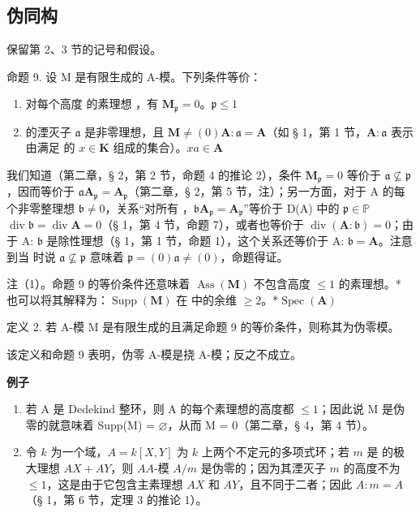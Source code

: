 \subsection{伪同构}

保留第 2、3 节的记号和假设。

命题 9. 设 M 是有限生成的 A-模。下列条件等价：

\begin{enumerate}
\def\labelenumi{(\alph{enumi})}
\item
  对每个高度  的素理想 ，有 \(\mathbf{M}_{\mathfrak{p}} = 0\)。\(\mathfrak{p}\)\(\leqslant 1\)
\item
   的湮灭子 \(\mathfrak{a}\) 是非零理想，且 \(\mathbf{M}\)\(\neq (0)\)\(\mathbf{A}:\mathfrak{a} = \mathbf{A}\)（如 § 1，第 1 节，\(\mathbf{A}:\mathfrak{a}\) 表示由满足  的 \(x\in \mathbf{K}\) 组成的集合）。\(xa\in \mathbf{A}\)
\end{enumerate}

我们知道（第二章，§ 2，第 2 节，命题 4 的推论 2），条件 \(\mathbf{M}_{\mathfrak{p}} = 0\) 等价于 \(\mathfrak{a} \nsubseteq \mathfrak{p}\)，因而等价于 \(\mathfrak{a}\mathbf{A}_{\mathfrak{p}} = \mathbf{A}_{\mathfrak{p}}\)（第二章，§ 2，第 5 节，注）；另一方面，对于 A 的每个非零整理想 \(\mathfrak{b} \neq 0\)，关系``对所有 ，\(\mathfrak{b}\mathbf{A}_{\mathfrak{p}} = \mathbf{A}_{\mathfrak{p}}\)''等价于 D(A) 中的 \(\mathfrak{p} \in \mathbb{P}\)\(\operatorname{div} \mathfrak{b} = \operatorname{div} \mathbf{A} = 0\)（§ 1，第 4 节，命题 7），或者也等价于 \(\operatorname{div}(\mathbf{A}: \mathfrak{b}) = 0\)；由于 A: \(\mathfrak{b}\) 是除性理想（§ 1，第 1 节，命题 1），这个关系还等价于 A: \(\mathfrak{b} = \mathbf{A}\)。注意到当  时说 \(\mathfrak{a} \nsubseteq \mathfrak{p}\) 意味着 \(\mathfrak{p} = (0)\)\(\mathfrak{a} \neq (0)\)，命题得证。

注（1）。命题 9 的等价条件还意味着 \(\operatorname{Ass}(\mathbf{M})\) 不包含高度 \(\leqslant 1\) 的素理想。* 也可以将其解释为：\(\operatorname{Supp}(\mathbf{M})\) 在  中的余维 \(\geqslant 2\)。*\(\operatorname{Spec}(\mathbf{A})\)

定义 2. 若 A-模 M 是有限生成的且满足命题 9 的等价条件，则称其为伪零模。

该定义和命题 9 表明，伪零 A-模是挠 A-模；反之不成立。

\textbf{例子}\par

\begin{enumerate}
\def\labelenumi{(\arabic{enumi})}
\item
  若 A 是 Dedekind 整环，则 A 的每个素理想的高度都 \(\leqslant1\)；因此说 M 是伪零的就意味着 Supp(M) = \(\varnothing\)，从而 M = 0（第二章，§ 4，第 4 节）。
\item
  令 \(k\) 为一个域，\(A = k[X, Y]\) 为 \(k\) 上两个不定元的多项式环；若 \(m\) 是  的极大理想 \(AX + AY\)，则 \(A\)\(A\)-模 \(A/m\) 是伪零的；因为其湮灭子 \(m\) 的高度不为 \(\leqslant 1\)，这是由于它包含主素理想 \(AX\) 和 \(AY\)，且不同于二者；因此 \(A: m = A\)（§ 1，第 6 节，定理 3 的推论 1）。
\end{enumerate}

